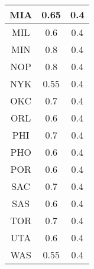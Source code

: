 \documentclass[a4paper,11pt]{article}
\begin{document}
\begin{table}[ht]
\begin{minipage}[b]{0.6\linewidth}
\begin{tabular}{|c|c|c|}
    MIA  & 0.65  & 0.4   \\ \hline
    MIL  & 0.6   & 0.4   \\ \hline
    MIN  & 0.8   & 0.4   \\ \hline
    NOP  & 0.8   & 0.4   \\ \hline
    NYK  & 0.55  & 0.4   \\ \hline
    OKC  & 0.7   & 0.4   \\ \hline
    ORL  & 0.6   & 0.4   \\ \hline
    PHI  & 0.7   & 0.4   \\ \hline
    PHO  & 0.6   & 0.4   \\ \hline
    POR  & 0.6   & 0.4   \\ \hline
    SAC  & 0.7   & 0.4   \\ \hline
    SAS  & 0.6   & 0.4   \\ \hline
    TOR  & 0.7   & 0.4   \\ \hline
    UTA  & 0.6   & 0.4   \\ \hline
    WAS  & 0.55  & 0.4   \\ \hline
    \end{tabular}
  \end{minipage}
\end{table}
\end{document}
